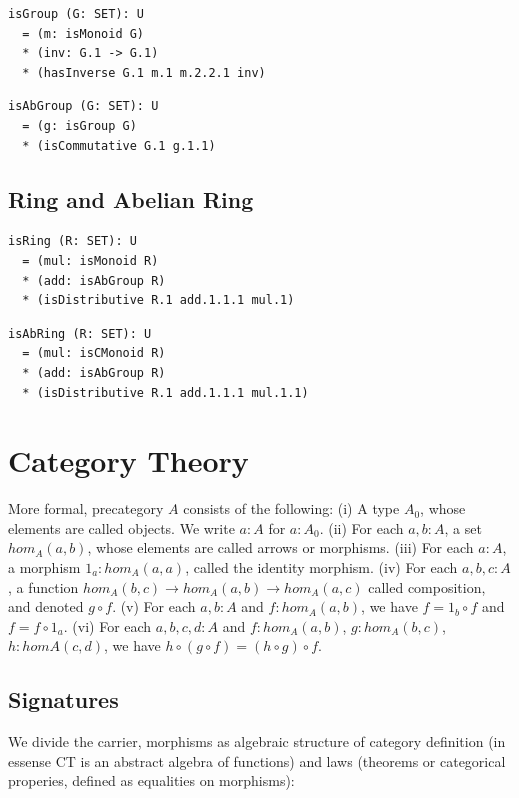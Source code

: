 \documentclass{article}
\begin{document}
\begin{lstlisting}[mathescape=true]
isGroup (G: SET): U
  = (m: isMonoid G)
  * (inv: G.1 -> G.1)
  * (hasInverse G.1 m.1 m.2.2.1 inv)
\end{lstlisting}

\begin{lstlisting}[mathescape=true]
isAbGroup (G: SET): U
  = (g: isGroup G)
  * (isCommutative G.1 g.1.1)
\end{lstlisting}

\subsection{Ring and Abelian Ring}

\begin{lstlisting}[mathescape=true]
isRing (R: SET): U
  = (mul: isMonoid R)
  * (add: isAbGroup R)
  * (isDistributive R.1 add.1.1.1 mul.1)
\end{lstlisting}

\begin{lstlisting}[mathescape=true]
isAbRing (R: SET): U
  = (mul: isCMonoid R)
  * (add: isAbGroup R)
  * (isDistributive R.1 add.1.1.1 mul.1.1)
\end{lstlisting}

\newpage
\section{Category Theory}

More formal, precategory $A$ consists of the following:
(i)   A type $A_0$, whose elements are called objects. We write $a: A$ for $a: A_0$.
(ii)  For each $a,b: A$, a set $hom_A(a,b)$, whose elements are called arrows or morphisms.
(iii) For each $a: A$, a morphism $1_a : hom_A(a,a)$, called the identity morphism.
(iv)  For each $a,b,c: A$, a function $hom_A(b,c) \rightarrow hom_A(a,b) \rightarrow hom_A(a,c)$
      called composition, and denoted $g \circ f$.
(v)   For each $a,b: A$ and $f: hom_A(a,b)$, we have $f = 1_b \circ f$ and $f = f \circ 1_a$.
(vi)  For each $a,b,c,d: A$ and $f: hom_A(a,b)$, $g: hom_A(b,c)$, $h: homA(c,d)$,
      we have $h \circ (g \circ f ) = (h \circ g) \circ f$.

\subsection{Signatures}

We divide the carrier, morphisms as algebraic structure of category
definition (in essense CT is an abstract algebra of functions) and laws (theorems
or categorical properies, defined as equalities on morphisms):
\end{document}
